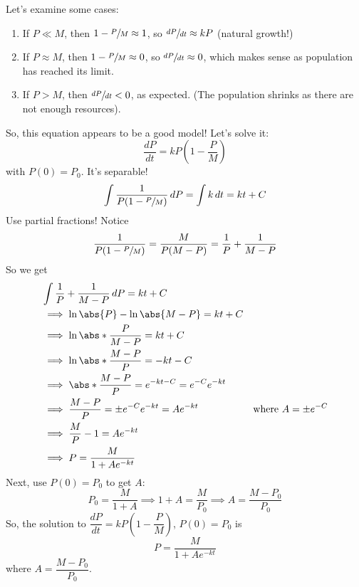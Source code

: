 Let's examine some cases:
\begin{enumerate}[label=(\Roman*)]
    \item If $ P\ll M $, then $ 1-\sfrac{P}{M}\approx 1 $, so $ \sfrac{dP}{dt} \approx kP $
          (natural growth!)
    \item If $ P\approx M $, then $ 1-\sfrac{P}{M}\approx 0 $, so $ \sfrac{dP}{dt}\approx 0 $,
          which makes sense as population has reached its limit.
    \item If $ P>M $, then $ \sfrac{dP}{dt} <0 $, as expected. (The population
          shrinks as there are not enough resources).
\end{enumerate}
So, this equation appears to be a good model! Let's solve it:
\[ \frac{dP}{dt} =kP\left(1-\frac{P}{M}\right) \]
with $ P(0)=P_0 $. It's separable!
\[ \int \frac{1}{P(1-\sfrac{P}{M})} \, d{P}=\int k\, d{t} =kt+C \]
Use partial fractions! Notice
\[ \frac{1}{P(1-\sfrac{P}{M})}=\frac{M}{P(M-P)} =\frac{1}{P} +\frac{1}{M-P} \]
So we get
\begin{align*}
     & \int \frac{1}{P} +\frac{1}{M-P} \, d{P}  =kt+C                                                   \\
     & \implies  \ln\abs{P}-\ln\abs{M-P}            =kt+C                                               \\
     & \implies  \ln\abs*{\frac{P}{M-P}}        =kt+C                                                   \\
     & \implies \ln\abs*{\frac{M-P}{P}}         =-kt-C                                                  \\
     & \implies  \abs*{\frac{M-P}{P}}           =e^{-kt-C}=e^{-C}e^{-kt}                                \\
     & \implies  \frac{M-P}{P}                  =\pm e^{-C}e^{-kt}=Ae^{-kt} & \text{where }A=\pm e^{-C} \\
     & \implies  \frac{M}{P} -1                 =Ae^{-kt}                                               \\
     & \implies  P                              =\frac{M}{1+Ae^{-kt}}
\end{align*}
Next, use $ P(0)=P_0 $ to get $ A $:
\[ P_0=\frac{M}{1+A}\implies 1+A=\frac{M}{P_0}\implies A=\frac{M-P_0}{P_0}  \]
So, the solution to $ \dfrac{dP}{dt}=kP\left( 1-\dfrac{P}{M} \right) $, $ P(0)=P_0 $
is
\[ \boxed{P=\frac{M}{1+Ae^{-kt}}}  \]
where $ \boxed{A=\dfrac{M-P_0}{P_0}} $.

